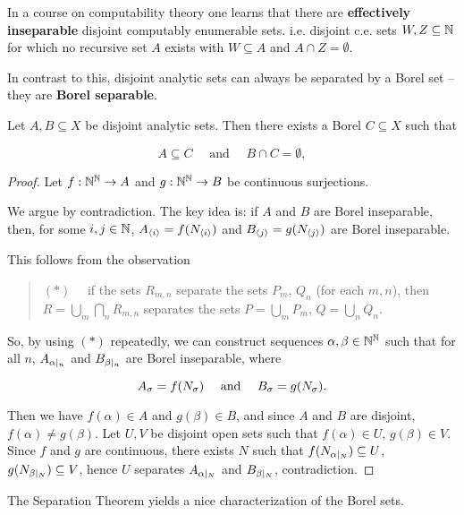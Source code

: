 In a course on computability theory one learns that there are \textbf{effectively inseparable} disjoint computably enumerable sets. i.e. disjoint c.e. sets $W,Z \subseteq \mathbb{N}$ for which no recursive set $A$ exists with $W \subseteq A$ and $A \cap Z = \emptyset$.

In contrast to this, disjoint analytic sets can always be separated by a Borel set -- they are \textbf{Borel separable}.

\begin{theorem}[Lusin]\label{thm-lusin-separation}Let $A, B \subseteq X$ be disjoint analytic sets. Then there exists a Borel $C \subseteq X$ such that

\begin{equation}
A \subseteq C \quad \text{ and } \quad B \cap C = \emptyset,
\end{equation}

\end{theorem}\begin{proof}Let $f:\mathbb{N}^{\mathbb{N}} \to A$ and $g:\mathbb{N}^{\mathbb{N}} \to B$ be continuous surjections.

We argue by contradiction. The key idea is: if $A$ and $B$ are Borel inseparable, then, for some $i,j \in \mathbb{N}$, $A_{\langle i \rangle} = f(N_{\langle i \rangle})$ and $B_{\langle j \rangle} = g(N_{\langle j \rangle})$ are Borel inseparable.

This follows from the observation

\begin{quote}
$(*)\quad$ if the sets  $R_{m,n}$ separate the sets  $P_m, \, Q_n$ (for each $m,n$), then $R = \bigcup_m \bigcap_n R_{m,n}$ separates the sets $P =  \bigcup_m P_m, \, Q =  \bigcup_n Q_n.$
\end{quote}

So, by using $(*)$ repeatedly, we can construct sequences $\alpha, \beta \in \mathbb{N}^{\mathbb{N}}$ such that for all $n$,
$A_{\alpha\mid_{n}}$ and $B_{\beta\mid_{n}}$ are Borel inseparable, where

\begin{equation}
A_{\sigma} = f(N_{\sigma}) \quad \text{ and } \quad B_{\sigma} = g(N_{\sigma}).
\end{equation}

Then we have $f(\alpha) \in A$ and $g(\beta) \in B$, and since $A$ and $B$ are disjoint, $f(\alpha) \neq g(\beta)$. Let $U,V$ be disjoint open sets such that $f(\alpha) \in U$, $g(\beta) \in V$. Since $f$ and $g$ are continuous, there exists $N$ such that $f(N_{\alpha\mid_{N}}) \subseteq U$, $g(N_{\beta\mid_{N}}) \subseteq V$, hence $U$ separates $A_{\alpha\mid_{N}}$ and $B_{\beta\mid_{N}}$, contradiction.

\end{proof}The Separation Theorem yields a nice characterization of the Borel sets.

